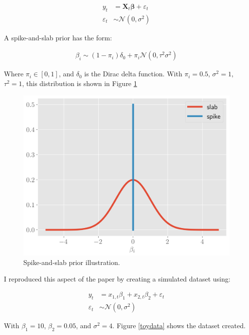 \documentclass[12pt]{article}
\begin{document}
\begin{align}
    y_t &=  \boldsymbol{X}_t\boldsymbol{\beta} + \varepsilon_t\\
     \varepsilon_t &\sim \mathcal{N}(0, \sigma^2)
\end{align}

A spike-and-slab prior has the form:

\begin{align}
    \beta_i \sim (1-\pi_i)\delta_0 + \pi_i\mathcal{N}(0, \tau^2\sigma^2)
\end{align}


Where $\pi_i \in [0, 1]$, and $\delta_0$ is the Dirac delta function. With $\pi_i = 0.5$, $\sigma^2 = 1$, $\tau^2 = 1$, this distribution is shown in Figure \ref{prior}



\begin{figure}[!h]
    \centering
    \includegraphics[scale=.6
    ]{../figures/spike.png}
    \caption{Spike-and-slab prior illustration.}
    \label{prior}
\end{figure}

I reproduced this aspect of the paper by creating a simulated dataset using:

\begin{align*}
    y_t& = x_{1, t}\beta_1 + x_{2, t}\beta_2 + \varepsilon_t\\
    \varepsilon_t &\sim \mathcal{N}(0, \sigma^2)
\end{align*}

With $\beta_1 = 10$,  $\beta_2 = 0.05$, and $\sigma^2 = 4$. Figure \ref{toydata} shows the dataset created. 
\end{document}
